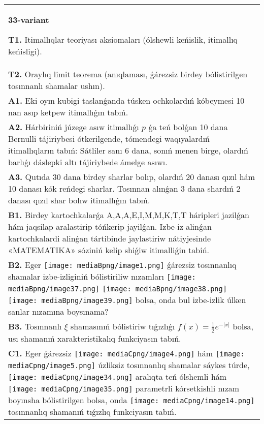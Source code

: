 \documentclass{article}
\begin{document}
\begin{tabular}{m{17cm}}
\textbf{33-variant}
\newline

\textbf{T1.} Itimallıqlar teoriyası aksiomaları (ólshewli keńislik, itimallıq keńisligi).
 \\
\textbf{T2.} Oraylıq limit teorema (anıqlaması, ǵárezsiz birdey bólistirilgen tosınnanlı shamalar ushın).
 \\
\textbf{A1.} Eki oyın kubigi taslanǵanda túsken ochkolardıń kóbeymesi 10 nan asıp ketpew itimallıǵın tabıń.
 \\
\textbf{A2.} Hárbiriniń júzege asıw itimallıǵı $p$ ǵa teń bolǵan 10 dana Bernulli tájiriybesi ótkerilgende, tómendegi waqıyalardıń itimallıqların tabıń: Sátliler sanı 6 dana, sonıń menen birge, olardıń barlıǵı dáslepki altı tájiriybede ámelge asıwı.
 \\
\textbf{A3.} Qutıda 30 dana birdey sharlar bolıp, olardıń 20 danası qızıl hám 10 danası kók reńdegi sharlar. Tosınnan alınǵan 3 dana shardıń 2 danası qızıl shar bolıw itimallıǵın tabıń.
 \\
\textbf{B1.} Birdey kartochkalarǵa A,A,A,E,I,M,M,K,T,T háripleri jazilǵan hám jaqsilap aralastirip tóńkerip jayilǵan. Izbe-iz alinǵan kartochkalardi alinǵan tártibinde jaylastiriw nátiyjesinde «MATEMATIKA» sóziniń kelip shiǵiw itimalliǵin tabiń.
 \\
\textbf{B2.} Eger \texttt{[image: mediaBpng/image1.png]} ǵárezsiz tosınnanlıq shamalar izbe-izliginiń bólistiriliw nızamları
\texttt{[image: mediaBpng/image37.png]} \texttt{[image: mediaBpng/image38.png]} \texttt{[image: mediaBpng/image39.png]}
bolsa, onda bul izbe-izlik úlken sanlar nızamına boysınama?
 \\
\textbf{B3.} Tosınnanlı \(\xi\) shamasınıń bólistiriw tıǵızlıǵı \(f(x) = \frac{1}{2}e^{- |x|}\) bolsa, usı shamanıń xarakteristikalıq funkciyasın tabıń.
 \\
\textbf{C1.} Eger ǵárezsiz \texttt{[image: mediaCpng/image4.png]} hám \texttt{[image: mediaCpng/image5.png]} úzliksiz tosınnanlıq shamalar sáykes túrde, \texttt{[image: mediaCpng/image34.png]} aralıqta teń ólshemli hám \texttt{[image: mediaCpng/image35.png]} parametrli kórsetkishli nızam boyınsha bólistirilgen bolsa, onda \texttt{[image: mediaCpng/image14.png]} tosınnanlıq shamanıń tıǵızlıq funkciyasın tabıń.

\end{tabular}
\end{document}
